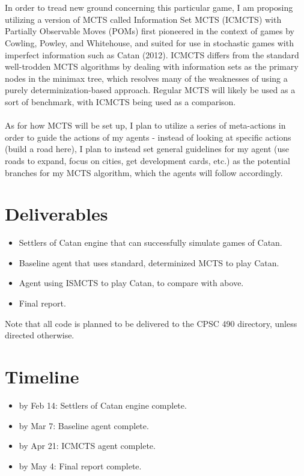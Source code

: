 \documentclass[a4paper, 11pt]{article}
\begin{document}
\\ \\
\noindent In order to tread new ground concerning this particular game, I am proposing utilizing a version of MCTS called Information Set MCTS (ICMCTS) with Partially Observable Moves (POMs) first pioneered in the context of games by Cowling, Powley, and Whitehouse, and suited for use in stochastic games with imperfect information such as Catan (2012). ICMCTS differs from the standard well-trodden MCTS algorithms by dealing with information sets as the primary nodes in the minimax tree, which resolves many of the weaknesses of using a purely determinization-based approach. Regular MCTS will likely be used as a sort of benchmark, with ICMCTS being used as a comparison. 
\\ \\
\noindent As for how MCTS will be set up, I plan to utilize a series of meta-actions in order to guide the actions of my agents - instead of looking at specific actions (build a road here), I plan to instead set general guidelines for my agent (use roads to expand, focus on cities, get development cards, etc.) as the potential branches for my MCTS algorithm, which the agents will follow accordingly.

\section{Deliverables}

\begin{itemize}
	\item Settlers of Catan engine that can successfully simulate games of Catan.
	\item Baseline agent that uses standard, determinized MCTS to play Catan.
	\item Agent using ISMCTS to play Catan, to compare with above.
	\item Final report.
\end{itemize}
Note that all code is planned to be delivered to the CPSC 490 directory, unless directed otherwise.

\section{Timeline}

\begin{itemize}
	\item by Feb 14: Settlers of Catan engine complete.
	\item by Mar 7: Baseline agent complete.
	\item by Apr 21: ICMCTS agent complete.
	\item by May 4: Final report complete.
\end{itemize}

\clearpage

\nocite{*}

\end{document}

